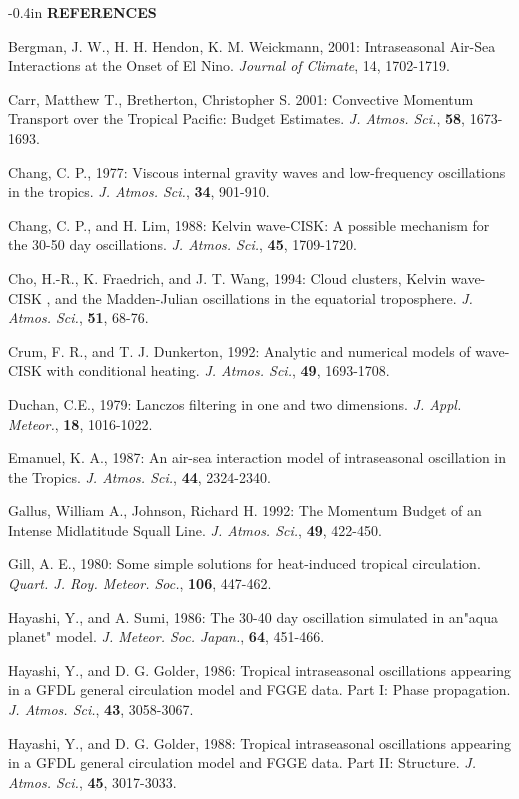 \documentclass[12pt]{article}
\begin{document}
\newpage

\setlength {\parindent} {-0.4in}
{\bf REFERENCES}

Bergman, J. W., H. H. Hendon, K. M. Weickmann, 2001: Intraseasonal Air-Sea
Interactions at the Onset of El Nino.
{\it Journal of Climate}, 14, 1702-1719.

Carr, Matthew T., Bretherton, Christopher S. 2001: Convective Momentum 
Transport over the Tropical Pacific: Budget Estimates.
{\it J. Atmos. Sci.}, {\bf 58}, 1673-1693.

Chang, C. P., 1977: Viscous internal gravity waves and low-frequency 
oscillations in the tropics. {\it J. Atmos. Sci.}, {\bf 34}, 901-910.

Chang, C. P., and H. Lim, 1988: Kelvin wave-CISK: A possible mechanism for
the 30-50 day oscillations. {\it J. Atmos. Sci.}, {\bf 45}, 1709-1720.

Cho, H.-R., K. Fraedrich, and J. T. Wang, 1994: Cloud clusters, Kelvin wave-CISK
, and the Madden-Julian oscillations in the equatorial troposphere.
{\it J. Atmos. Sci.}, {\bf 51}, 68-76.

Crum, F. R., and T. J. Dunkerton, 1992: Analytic and numerical models of 
wave-CISK
with conditional heating. {\it J. Atmos. Sci.}, {\bf 49}, 1693-1708.

Duchan, C.E., 1979: Lanczos filtering in one and two dimensions.
{\it J. Appl. Meteor.}, {\bf 18}, 1016-1022.

Emanuel, K. A., 1987: An air-sea interaction model of intraseasonal oscillation
in the Tropics.
{\it J. Atmos. Sci.}, {\bf 44}, 2324-2340.

Gallus, William A., Johnson, Richard H. 1992: The Momentum Budget of an Intense 
Midlatitude Squall Line. 
{\it J. Atmos. Sci.}, {\bf 49}, 422-450.

Gill, A. E., 1980: Some simple solutions for heat-induced tropical circulation.
{\it Quart. J. Roy. Meteor. Soc.}, {\bf 106}, 447-462.

Hayashi, Y., and A. Sumi, 1986: The 30-40 day oscillation simulated in an"aqua
planet" model. {\it J. Meteor. Soc. Japan.}, {\bf 64}, 451-466.

Hayashi, Y., and D. G. Golder, 1986: Tropical intraseasonal oscillations
appearing in a GFDL general circulation model and FGGE data. Part I: Phase
propagation.
{\it J. Atmos. Sci.}, {\bf 43}, 3058-3067.

Hayashi, Y., and D. G. Golder, 1988: Tropical intraseasonal oscillations
appearing
in a GFDL general circulation model and FGGE data. Part II: Structure.
{\it J. Atmos. Sci.}, {\bf 45}, 3017-3033.
\end{document}

